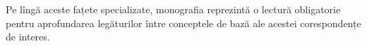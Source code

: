 \documentclass[a4paper]{article}
\begin{document}
Pe lîngă aceste fațete specializate, monografia \cite{ch} reprezintă o lectură
obligatorie pentru aprofundarea le\-gă\-tu\-ri\-lor între conceptele de bază ale
acestei corespondențe de interes. 

\vspace{3cm}





    
\end{document}
